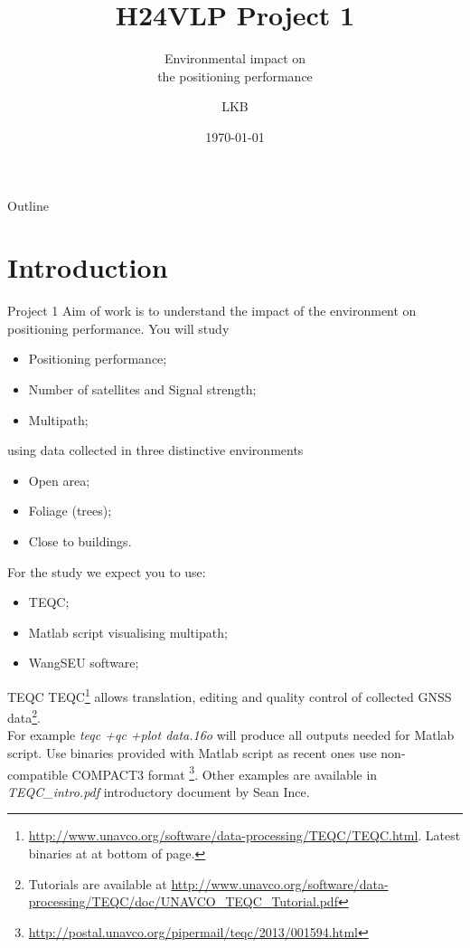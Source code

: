 \documentclass[11pt]{beamer}
\title[H24VLP]{H24VLP Project 1}
\subtitle{Environmental impact on \\the positioning performance}
\author{LKB}
\institute{NGI}
\date{\today}
\begin{document}
	
	\begin{frame}
		\titlepage
	\end{frame}
	
	\begin{frame}{Outline}
	  \tableofcontents
	\end{frame}
	
\section{Introduction}

	\begin{frame}[allowframebreaks]{Project 1}
		Aim of work is to understand the impact of the environment on positioning performance. You will study 
		\begin{itemize}
			\item Positioning performance;
			\item Number of satellites and Signal strength;
			\item Multipath;
		\end{itemize}
		using data collected in three distinctive environments
		\begin{itemize}
			\item Open area;
			\item Foliage (trees);
			\item Close to buildings.
		\end{itemize}
		For the study we expect you to use:
		\begin{itemize}
			\item TEQC;
			\item Matlab script visualising multipath;
			\item WangSEU software;
		\end{itemize}

	\end{frame}


	\begin{frame}{TEQC}
		TEQC\footnote{\url{http://www.unavco.org/software/data-processing/TEQC/TEQC.html}. Latest binaries at at bottom of page.} allows translation, editing and quality control of collected GNSS data\footnote{Tutorials are available at \url{http://www.unavco.org/software/data-processing/TEQC/doc/UNAVCO_TEQC_Tutorial.pdf}}. \\
		\medskip
		For example \alert{\textit{ teqc +qc +plot data.16o}} will produce all outputs needed for Matlab script. Use binaries provided with Matlab script as recent ones use non-compatible COMPACT3 format \footnote{\url{http://postal.unavco.org/pipermail/teqc/2013/001594.html}}. Other examples are available in \textit{TEQC\_intro.pdf} introductory document by Sean Ince.

	\end{frame}
\end{document}
